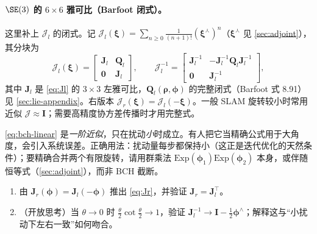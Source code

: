 \paragraph{$\SE(3)$ 的 $6\times6$ 雅可比（Barfoot 闭式）。}
这里补上 $\boldsymbol{\mathcal{J}}_l$ 的闭式\cite{barfoot2024state}。记 $\boldsymbol{\mathcal{J}}_l(\boldsymbol{\xi})=\sum_{n\ge0}\frac{1}{(n+1)!}(\boldsymbol{\xi}^\curlywedge)^n$（$\boldsymbol{\xi}^\curlywedge$ 见 \cref{sec:adjoint}），其分块为
\begin{equation}
  \boldsymbol{\mathcal{J}}_l(\boldsymbol{\xi})=\begin{bmatrix}\mathbf{J}_l&\mathbf{Q}_l\\\mathbf{0}&\mathbf{J}_l\end{bmatrix},\qquad
  \boldsymbol{\mathcal{J}}_l^{-1}=\begin{bmatrix}\mathbf{J}_l^{-1}&-\mathbf{J}_l^{-1}\mathbf{Q}_l\mathbf{J}_l^{-1}\\\mathbf{0}&\mathbf{J}_l^{-1}\end{bmatrix},
  \label{eq:se3-6x6}
\end{equation}
其中 $\mathbf{J}_l$ 是 \cref{eq:Jl} 的 $3\times3$ 左雅可比，$\mathbf{Q}_l(\boldsymbol{\rho},\boldsymbol{\phi})$ 的完整闭式（Barfoot 式 8.91）见 \cref{sec:lie-appendix}。右版本 $\boldsymbol{\mathcal{J}}_r(\boldsymbol{\xi})=\boldsymbol{\mathcal{J}}_l(-\boldsymbol{\xi})$。一般 SLAM 旋转较小时常用近似 $\boldsymbol{\mathcal{J}}\approx\mathbf{I}$；需要高精度协方差传播时才用完整式。

\begin{pitfall}
\cref{eq:bch-linear} 是\emph{一阶近似}，只在扰动\emph{小}时成立。有人把它当精确公式用于大角度，会引入系统误差。正确用法：扰动量每步都保持小（这正是迭代优化的天然条件）；要精确合并两个有限旋转，请用群乘法 $\mathrm{Exp}(\boldsymbol{\phi}_1)\mathrm{Exp}(\boldsymbol{\phi}_2)$ 本身，或伴随恒等式（\cref{sec:adjoint}），而非 BCH 截断。
\end{pitfall}

\begin{practice}
\begin{enumerate}
  \item 由 $\mathbf{J}_r(\boldsymbol{\phi})=\mathbf{J}_l(-\boldsymbol{\phi})$ 推出 \cref{eq:Jr}，并验证 $\mathbf{J}_r=\mathbf{J}_l^\top$。
  \item （开放思考）当 $\theta\to0$ 时 $\tfrac{\theta}{2}\cot\tfrac{\theta}{2}\to1$，验证 $\mathbf{J}_l^{-1}\to\mathbf{I}-\tfrac12\boldsymbol{\phi}^\wedge$；解释这与“小扰动下左右一致”如何吻合。
\end{enumerate}
\end{practice}

